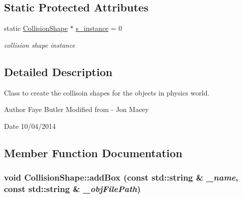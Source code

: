 \subsection*{Static Protected Attributes}
\begin{DoxyCompactItemize}
\item 
\hypertarget{classCollisionShape_ab7309a9cab3da9e7e2fc7e7c1e1eaa26}{
static \hyperlink{classCollisionShape}{CollisionShape} $\ast$ \hyperlink{classCollisionShape_ab7309a9cab3da9e7e2fc7e7c1e1eaa26}{s\_\-instance} = 0}
\label{classCollisionShape_ab7309a9cab3da9e7e2fc7e7c1e1eaa26}

\begin{DoxyCompactList}\small\item\em collision shape instance \item\end{DoxyCompactList}\end{DoxyCompactItemize}


\subsection{Detailed Description}
Class to create the collisoin shapes for the objects in physics world. \begin{DoxyAuthor}{Author}
Faye Butler Modified from -\/ Jon Macey 
\end{DoxyAuthor}
\begin{DoxyDate}{Date}
10/04/2014 
\end{DoxyDate}


\subsection{Member Function Documentation}
\hypertarget{classCollisionShape_ad1f816e259bf91027c8e775f89ed76a4}{
\subsubsection[{addBox}]{\setlength{\rightskip}{0pt plus 5cm}void CollisionShape::addBox (const std::string \& {\em \_\-name}, \/  const std::string \& {\em \_\-objFilePath})}}
\label{classCollisionShape_ad1f816e259bf91027c8e775f89ed76a4}


